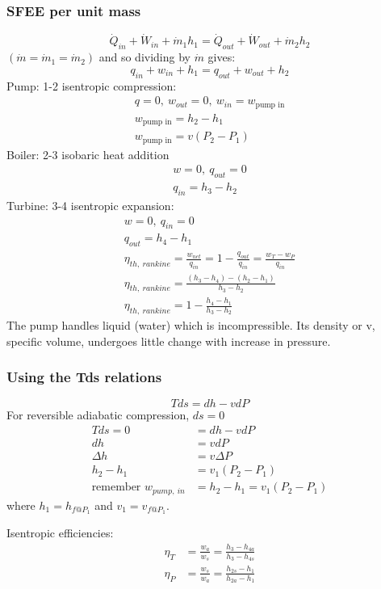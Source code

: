 \documentclass[class=report, crop=false, 12pt,a4paper]{standalone}
\begin{document}
\subsubsection{SFEE per unit mass}
\begin{equation}
  \dot{Q}_{in} + \dot{W}_{in} + \dot{m}_1 h_1 = \dot{Q}_{out} + \dot{W}_{out} + \dot{m}_2 h_2
\end{equation}
$(\dot{m} = \dot{m}_1 = \dot{m}_2)$ and so dividing by $\dot{m}$ gives:
\begin{equation}
  q_{in} + w_{in} + h_1 = q_{out} + w_{out} + h_2
\end{equation}
Pump: 1-2 isentropic compression:
\begin{gather}
  q = 0,\  w_{out} = 0, \ w_{in} = w_{\textrm{pump in}}\\
  w_{\textrm{pump in}} = h_2 - h_1\\
  w_{\textrm{pump in}} = v(P_2 - P_1)
\end{gather}
Boiler: 2-3 isobaric heat addition
\begin{gather}
  w = 0,\  q_{out} = 0\\
  q_{in} = h_3 - h_2
\end{gather}
Turbine: 3-4 isentropic expansion:
\begin{gather}
  w = 0,\ q_{in} = 0\\
  q_{out} = h_4 - h_1\\
  \eta_{th, \ rankine} = \frac{w_{net}}{q_{in}} = 1 - \frac{q_{out}}{q_{in}} = \frac{w_T - w_P}{q_{in}}\\
  \eta_{th, \ rankine} = \frac{(h_3 - h_4) - (h_2 - h_1)}{h_3 - h_2}\\
  \eta_{th, \ rankine} = 1 - \frac{h_4 - h_1}{h_3 - h_2}
\end{gather}
The pump handles liquid (water) which is incompressible. Its density or v, specific volume, undergoes little change with increase in pressure.
\subsubsection{Using the Tds relations}
\begin{equation}
  Tds = dh - vdP
\end{equation}
For reversible adiabatic compression, $ds = 0$
\begin{align}
  Tds = 0 &= dh - vdP\\
  dh &= vdP\\
  \Delta h &= v\Delta P\\
  h_2 - h_1 &= v_1 (P_2 - P_1)\\
  \textrm{remember } w_{pump,\  in} &= h_2 - h_1 = v_1 (P_2 - P_1)
\end{align}
where $h_1 = h_{f@P_1}$ and $v_1 = v_{f@P_1}$.

Isentropic efficiencies:
\begin{align}
  \eta_T &= \frac{w_a}{w_s} = \frac{h_3 - h_{4a}}{h_3 - h_{4s}}\\
  \eta_P &= \frac{w_s}{w_a} = \frac{h_{2s} - h_{1}}{h_{2a} - h_{1}}
\end{align}
\end{document}
